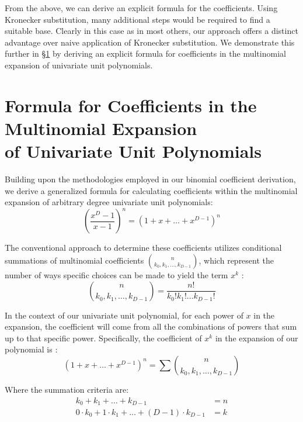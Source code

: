 \documentclass{article}
\theoremstyle{plain}
\theoremstyle{definition}
\begin{document}
From the above, we can derive an explicit formula for the coefficients. Using Kronecker substitution, many additional steps would be required to find a suitable base. Clearly in this case as in most others, our approach offers a distinct advantage over naive application of Kronecker substitution. We demonstrate this further in \S \ref{sec:multinomialformula} by deriving an explicit formula for coefficients in the multinomial expansion of univariate unit polynomials.

\section[Formula for Coefficients in the Multinomial Expansion of Univariate Unit Polynomials]{Formula for Coefficients in the Multinomial Expansion\\of Univariate Unit Polynomials}
\label{sec:multinomialformula}
Building upon the methodologies employed in our binomial coefficient derivation, we derive a generalized formula for calculating coefficients within the multinomial expansion of arbitrary degree univariate unit polynomials:
\begin{equation}
    \left(\frac{x^{D}-1}{x-1}\right)^n = (1 + x + \ldots + x^{D-1})^n 
\end{equation}

The conventional approach to determine these coefficients utilizes conditional summations of multinomial coefficients \(\binom{n}{k_0, k_1, \ldots, k_{D-1}}\), which represent the number of ways specific choices can be made to yield the term \(x^k\) \cite{graham1994concrete}:
\begin{equation}
    \binom{n}{k_0, k_1, \ldots, k_{D-1}} = \frac{n!}{k_0! k_1! \ldots k_{D-1}!}
\end{equation}

In the context of our univariate unit polynomial, for each power of \(x\) in the expansion, the coefficient will come from all the combinations of powers that sum up to that specific power. Specifically, the coefficient of \(x^k\) in the expansion of our polynomial is \cite{brualdi2010intro}:
\begin{equation}
    [x^k](1 + x + \ldots + x^{D-1})^n = \sum \binom{n}{k_0, k_1, \ldots, k_{D-1}}
\end{equation}

Where the summation criteria are:
\begin{align}
    k_0 + k_1 + \ldots + k_{D-1} &= n \\
    0 \cdot k_0 + 1 \cdot k_1 + \ldots + (D-1) \cdot k_{D-1} &= k
\end{align}
\end{document}
